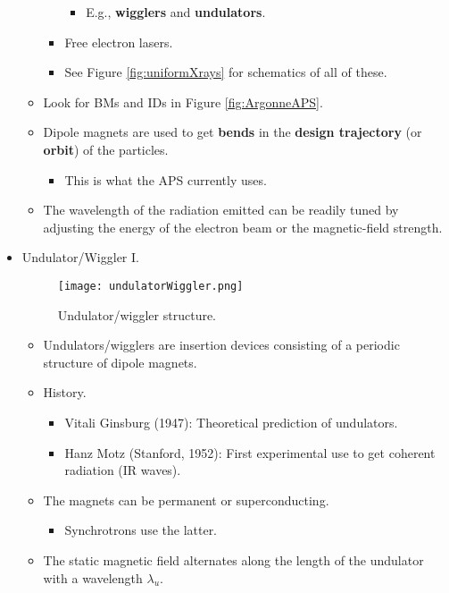 \documentclass[../notes.tex]{subfiles}
\begin{document}
\begin{itemize}
\begin{itemize}
\begin{itemize}
\begin{itemize}
                \item E.g., \textbf{wigglers} and \textbf{undulators}.
            \end{itemize}
            \item Free electron lasers.
            \item See Figure \ref{fig:uniformXrays} for schematics of all of these.
        \end{itemize}
        \item Look for BMs and IDs in Figure \ref{fig:ArgonneAPS}.
        \item Dipole magnets are used to get \textbf{bends} in the \textbf{design trajectory} (or \textbf{orbit}) of the particles.
        \begin{itemize}
            \item This is what the APS currently uses.
        \end{itemize}
        \item The wavelength of the radiation emitted can be readily tuned by adjusting the energy of the electron beam or the magnetic-field strength.
    \end{itemize}
    \item Undulator/Wiggler I.
    \begin{figure}[h!]
        \centering
        \texttt{[image: undulatorWiggler.png]}
        \caption{Undulator/wiggler structure.}
        \label{fig:undulatorWiggler}
    \end{figure}
    \begin{itemize}
        \item Undulators/wigglers are insertion devices consisting of a periodic structure of dipole magnets.
        \item History.
        \begin{itemize}
            \item Vitali Ginsburg (1947): Theoretical prediction of undulators.
            \item Hanz Motz (Stanford, 1952): First experimental use to get coherent radiation (IR waves).
        \end{itemize}
        \item The magnets can be permanent or superconducting.
        \begin{itemize}
            \item Synchrotrons use the latter.
        \end{itemize}
        \item The static magnetic field alternates along the length of the undulator with a wavelength $\lambda_u$.

\end{itemize}
\end{itemize}
\end{document}
